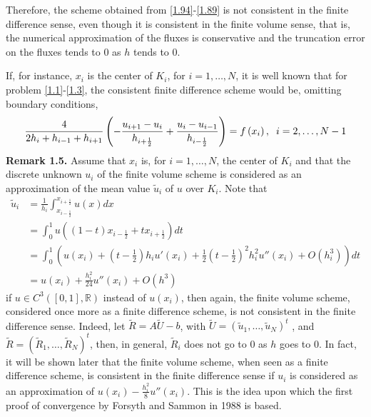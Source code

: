 \documentclass[a4paper]{article}
\numberwithin{equation}{section}
\begin{document}
Therefore, the scheme obtained from \eqref{1.94}-\eqref{1.89} is not consistent in the finite difference sense, even though it is consistent in the finite volume sense, that is, the numerical approximation of the fluxes is conservative and the truncation error on the fluxes tends to 0 as $h$ tends to 0.

If, for instance, $x_i$ is the center of $K_i$, for $i=1,\ldots,N$, it is well known that for problem \eqref{1.1}-\eqref{1.3}, the consistent finite difference scheme would be, omitting boundary conditions,
\begin{align}
\label{1.131}
\dfrac{4}{{2{h_i} + {h_{i - 1}} + {h_{i + 1}}}}\left( { - \frac{{{u_{i + 1}} - {u_i}}}{{{h_{i + \frac{1}{2}}}}} + \frac{{{u_i} - {u_{i - 1}}}}{{{h_{i - \frac{1}{2}}}}}} \right) = f\left( {{x_i}} \right),\hspace{0.2cm} i = 2, \ldots ,N - 1
\end{align}
\textbf{Remark 1.5.} Assume that $x_i$ is, for $i=1,\ldots,N$, the center of $K_i$ and that the discrete unknown $u_i$ of the finite volume scheme is considered as an approximation of the mean value $\widetilde{u}_i$ of $u$ over $K_i$. Note that
\begin{align}
{\widetilde u_i} &= \frac{1}{{{h_i}}}\int_{{x_{i - \frac{1}{2}}}}^{{x_{i + \frac{1}{2}}}} {u\left( x \right)dx} \\
& = \int_0^1 {u\left( {\left( {1 - t} \right){x_{i - \frac{1}{2}}} + t{x_{i + \frac{1}{2}}}} \right)dt} \\
& = \int_0^1 {\left( {u\left( {{x_i}} \right) + \left( {t - \frac{1}{2}} \right){h_i}u'\left( {{x_i}} \right) + \frac{1}{2}{{\left( {t - \frac{1}{2}} \right)}^2}h_i^2u''\left( {{x_i}} \right) + O\left( {h_i^3} \right)} \right)dt} \\
& = u\left( {{x_i}} \right) + \frac{{h_i^2}}{{24}}u''\left( {{x_i}} \right) + O\left( {{h^3}} \right) \label{1.135}
\end{align} 
if $u \in {C^3}\left( {\left[ {0,1} \right],\mathbb{R}} \right)$ instead of $u\left(x_i\right)$, then again, the finite volume scheme, considered once more as a finite difference scheme, is not consistent in the finite difference sense. Indeed, let $\widetilde R = A\widetilde U - b$, with $\widetilde U = {\left( {{{\widetilde u}_1}, \ldots ,{{\widetilde u}_N}} \right)^t}$ , and $\widetilde R = {\left( {{{\widetilde R}_1}, \ldots ,{{\widetilde R}_N}} \right)^t}$, then, in general, $\widetilde{R}_i$ does not go to 0 as $h$ goes to 0. In fact, it will be shown later that the finite volume scheme, when seen as a finite difference scheme, is consistent in the finite difference sense if $u_i$ is considered as an approximation of $u\left( {{x_i}} \right) - \frac{{h_i^2}}{8}{u''}\left( {{x_i}} \right)$. This is the idea upon which the first proof of convergence by Forsyth and Sammon in 1988 is based.
\end{document}
